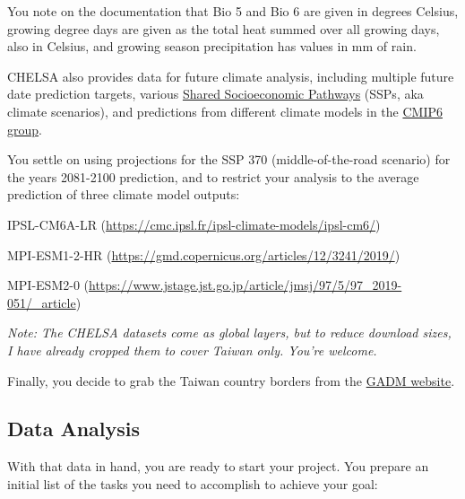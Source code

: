 \documentclass[
  letterpaper,
  DIV=11,
  numbers=noendperiod]{scrreprt}
\begin{document}
You note on the documentation that Bio 5 and Bio 6 are given in degrees
Celsius, growing degree days are given as the total heat summed over all
growing days, also in Celsius, and growing season precipitation has
values in mm of rain.

CHELSA also provides data for future climate analysis, including
multiple future date prediction targets, various
\href{https://www.carbonbrief.org/explainer-how-shared-socioeconomic-pathways-explore-future-climate-change/}{Shared
Socioeconomic Pathways} (SSPs, aka climate scenarios), and predictions
from different climate models in the
\href{https://www.carbonbrief.org/cmip6-the-next-generation-of-climate-models-explained/}{CMIP6
group}.

You settle on using projections for the SSP 370 (middle-of-the-road
scenario) for the years 2081-2100 prediction, and to restrict your
analysis to the average prediction of three climate model outputs:

IPSL-CM6A-LR (\url{https://cmc.ipsl.fr/ipsl-climate-models/ipsl-cm6/})

MPI-ESM1-2-HR (\url{https://gmd.copernicus.org/articles/12/3241/2019/})

MPI-ESM2-0
(\url{https://www.jstage.jst.go.jp/article/jmsj/97/5/97_2019-051/_article})

\emph{Note: The CHELSA datasets come as global layers, but to reduce
download sizes, I have already cropped them to cover Taiwan only. You're
welcome.}

Finally, you decide to grab the Taiwan country borders from the
\href{https://gadm.org/download_country.html}{GADM website}.

\subsection{Data Analysis}\label{data-analysis}

With that data in hand, you are ready to start your project. You prepare
an initial list of the tasks you need to accomplish to achieve your
goal:
\end{document}
